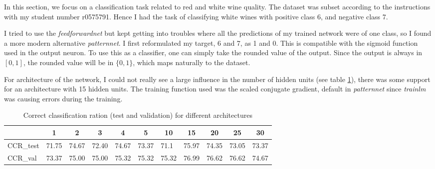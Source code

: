 \documentclass[11pt, a4paper]{article}
\begin{document}
In this section, we focus on a classification task related to red and
white wine quality. The dataset was subset according to the
instructions with my student number r0575791. Hence I had the task of
classifying white wines with positive class 6, and negative class 7.

I tried to use the \emph{feedforwardnet} but kept getting into
troubles where all the predictions of my trained network were of one
class, so I found a more modern alternative \emph{patternnet}. I first
reformulated my target, 6 and 7, as 1 and 0. This is compatible with
the sigmoid function used in the output neuron. To use this as a
classifier, one can simply take the rounded value of the output. Since
the output is always in $[0,1]$, the rounded value will be in $\{0,1\}$,
which maps naturally to the dataset.

For architecture of the network, I could not really see a large
influence in the number of hidden units (see table \ref{tab:ccr}),
there was some support for an architecture with 15 hidden units. The
training function used was the scaled conjugate gradient, default in
\emph{patternnet} since \emph{trainlm} was causing errors during the
training.

\begin{table}[H]
  \vspace{20pt}
  \centering
  \begin{tabular}{l|l|l|l|l|l|l|l|l|l|l|}
    \cline{2-11}
    & \multicolumn{1}{c|}{1} & \multicolumn{1}{c|}{2} & \multicolumn{1}{c|}{3} & \multicolumn{1}{c|}{4} & \multicolumn{1}{c|}{5} & \multicolumn{1}{c|}{10} & \multicolumn{1}{c|}{15} & \multicolumn{1}{c|}{20} & \multicolumn{1}{c|}{25} & \multicolumn{1}{c|}{30} \\ \hline
    \multicolumn{1}{|l|}{CCR\_test} & 71.75                  & 74.67                  & 72.40                  & 74.67                  & 73.37                  & 71.1                    & 75.97                   & 74.35                   & 73.05                   & 73.37                   \\ \hline
    \multicolumn{1}{|l|}{CCR\_val}  & 73.37                  & 75.00                  & 75.00                  & 75.32                  & 75.32                  & 75.32                   & 76.99                   & 76.62                   & 76.62                   & 74.67                   \\ \hline
  \end{tabular}
  \caption{Correct classification ration (test and validation) for different architectures}
  \label{tab:ccr}
\end{table}
\end{document}
